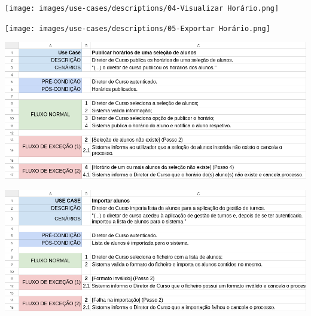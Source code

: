 \documentclass[a4paper,12pt]{scrreprt}
\begin{document}
\begin{minipage}{\textwidth}
    \centering
    \texttt{[image: images/use-cases/descriptions/04-Visualizar Horário.png]}
    \label{fig:3-04-visualizar_horario}
\end{minipage}

\begin{minipage}{\textwidth}
    \centering
    \texttt{[image: images/use-cases/descriptions/05-Exportar Horário.png]}
    \label{fig:3-05-exportar_horario}
\end{minipage}

\begin{minipage}{\textwidth}
    \centering
    \includegraphics[width=1\textwidth]{images/use-cases/descriptions/06-Publicar horários de uma seleção de alunos.png}
    \label{fig:3-06-publicar_horarios_de_uma_selecao_de_alunos}
\end{minipage}

\begin{minipage}{\textwidth}
    \centering
    \includegraphics[width=1\textwidth]{images/use-cases/descriptions/07-Importar alunos.png}
    \label{fig:3-07-importar_alunos}
\end{minipage}
\end{document}

